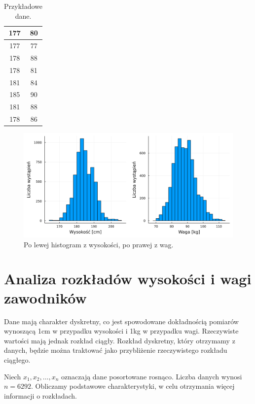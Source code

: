 \documentclass[12pt]{mwart}
\begin{document}
\begin{table}[H]
\begin{multicols}{2}
\begin{table}[H]
\begin{tabular}{|c|c|}
				177 & 80 \\ \hline
				177 & 77 \\ \hline
				178 & 88 \\ \hline
				178 & 81 \\ \hline
				181 & 84 \\ \hline
				185 & 90 \\ \hline
				181 & 88 \\ \hline
				178 & 86 \\ \hline
			\end{tabular}
		\end{table}
	\end{multicols}
	\caption{Przykładowe dane.}
	\end{table}
	
	\begin{figure}[H]
		\centering
		\includegraphics[scale=0.1]{images/histograms.png}
		\caption{Po lewej histogram z wysokości, po prawej z wag.}
	\end{figure}
	
	
	\section{Analiza rozkładów wysokości i wagi zawodników}
	
	Dane mają charakter dyskretny, co jest spowodowane dokładnością pomiarów wynoszącą 1cm w przypadku wysokości i 1kg w przypadku wagi. Rzeczywiste wartości mają jednak rozkład ciągły. Rozkład dyskretny, który otrzymamy z danych, będzie można traktować jako przybliżenie rzeczywistego rozkładu ciągłego.
	
	Niech $ x_1, x_2, \dots, x_n $ oznaczają dane posortowane rosnąco. Liczba danych wynosi $ n = 6292 $. Obliczamy podstawowe charakterystyki, w celu otrzymania więcej informacji o rozkładach.
	
\end{document}
